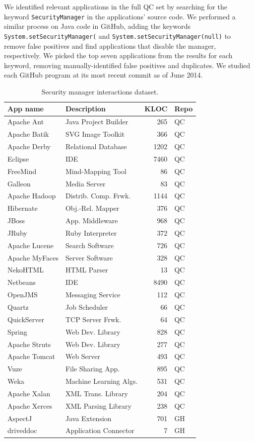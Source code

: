 \documentclass{sig-alternate}
\begin{document}
We identified relevant applications in the full QC set 
by searching for the keyword \texttt{SecurityManager} in the applications'
source code.  We performed a similar process on
Java code in GitHub, adding the keywords
\texttt{System.setSecurityManager(} and \texttt{System.setSecurityManager(null)}
to remove false positives and find applications that disable the
manager, respectively. We picked the top seven applications from the results for each keyword,
removing manually-identified false positives and duplicates. 
We studied each GitHub program at its most
recent commit as of June 2014.


\begin{table}
\small
\caption{Security manager interactions
  dataset.\label{Table:applications-studied}}
\begin{tabular}{llrl}
\toprule 
App name & Description & KLOC & Repo\tabularnewline
\midrule
Apache Ant & Java Project Builder & 265 & QC\tabularnewline
Apache Batik & SVG Image Toolkit & 366 & QC\tabularnewline
Apache Derby & Relational Database & 1202 & QC\tabularnewline
Eclipse  & IDE & 7460 & QC\tabularnewline
FreeMind & Mind-Mapping Tool & 86 & QC\tabularnewline
Galleon & Media Server & 83 & QC\tabularnewline
Apache Hadoop & Distrib. Comp. Frwk. & 1144 & QC\tabularnewline
Hibernate & Obj.-Rel. Mapper & 376 & QC\tabularnewline
JBoss & App. Middleware & 968 & QC\tabularnewline
JRuby & Ruby Interpreter & 372 & QC\tabularnewline
Apache Lucene & Search Software & 726 & QC\tabularnewline
Apache MyFaces & Server Software & 328 & QC\tabularnewline
NekoHTML & HTML Parser & 13 & QC\tabularnewline
Netbeans & IDE & 8490 & QC\tabularnewline
OpenJMS & Messaging Service & 112 & QC\tabularnewline
Quartz  & Job Scheduler & 66 & QC\tabularnewline
QuickServer & TCP Server Frwk. & 64 & QC\tabularnewline
Spring & Web Dev. Library & 828 & QC\tabularnewline
Apache Struts & Web Dev. Library & 277 & QC\tabularnewline
Apache Tomcat & Web Server & 493 & QC\tabularnewline
Vuze & File Sharing App. & 895 & QC\tabularnewline
Weka & Machine Learning Algs. & 531 & QC\tabularnewline
Apache Xalan & XML Trans. Library & 204 & QC\tabularnewline
Apache Xerces & XML Parsing Library & 238 & QC\tabularnewline
AspectJ & Java Extension & 701 & GH\tabularnewline
driveddoc & Application Connector & 7 & GH\tabularnewline

\end{tabular}
\end{table}
\end{document}
